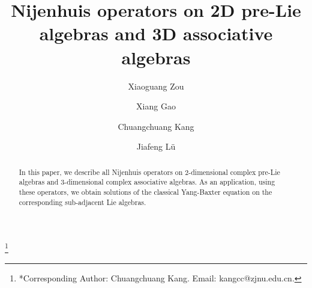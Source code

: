\documentclass[12pt, reqno]{amsart}
\theoremstyle{plain}
\newcommand\blfootnote[1]{%
  \begingroup
  \renewcommand\thefootnote{}\footnote{#1}%
  \addtocounter{footnote}{-1}%
  \endgroup
}
\begin{document}
\setlength{\baselineskip}{1.2\baselineskip}
\title[Nijenhuis operators on 2D pre-Lie algebras and 3D associative algebras]
{Nijenhuis operators on 2D pre-Lie algebras and 3D associative algebras}


\author{Xiaoguang Zou}
\address{
Zhejiang college \\
Shanghai University of Finance and Economics\\
Zhejiang, Jinhua 321013 \\
China}

\author{Xiang Gao}
\address{
School of Mathematical Sciences    \\
Zhejiang Normal University\\
Jinhua 321004              \\
China}

\author{Chuangchuang Kang}
\address{
School of Mathematical Sciences    \\
Zhejiang Normal University\\
Jinhua 321004              \\
China}





\author{Jiafeng L\"u}
\address{
School of Mathematical Sciences    \\
Zhejiang Normal University\\
Jinhua 321004              \\
China}

\blfootnote{*Corresponding Author: Chuangchuang Kang. Email: kangcc@zjnu.edu.cn.}
\date{}
\begin{abstract}In this paper, we describe all Nijenhuis operators on 2-dimensional complex pre-Lie algebras and 3-dimensional complex associative algebras. As an application, using these operators, we obtain solutions of the classical Yang-Baxter equation on the corresponding sub-adjacent Lie algebras.
\end{abstract}

\end{document}
